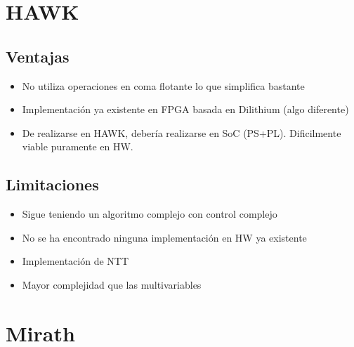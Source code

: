 \endgroup


\section{HAWK}

\subsection*{Ventajas}
\begin{itemize}
\item No utiliza operaciones en coma flotante lo que simplifica bastante
\item Implementación ya existente en FPGA basada en Dilithium (algo diferente)
\item De realizarse en HAWK, debería realizarse en SoC (PS+PL). Dificilmente viable puramente en HW.
\end{itemize}

\subsection*{Limitaciones}
\begin{itemize}
\item Sigue teniendo un algoritmo complejo con control complejo
\item No se ha encontrado ninguna implementación en HW ya existente
\item Implementación de NTT
\item Mayor complejidad que las multivariables
\end{itemize}

\section{Mirath}

